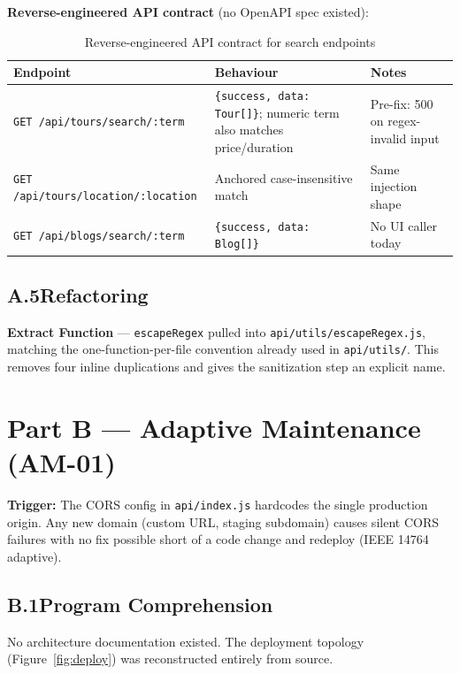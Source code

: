 \documentclass[11pt,a4paper]{article}
\begin{document}
\medskip\noindent\textbf{Reverse-engineered API contract} (no OpenAPI spec existed):
\begin{table}[H]
\centering\small
\begin{tabularx}{\textwidth}{@{}lXp{2.8cm}@{}}
\toprule
\textbf{Endpoint} & \textbf{Behaviour} & \textbf{Notes} \\
\midrule
\texttt{GET /api/tours/search/:term} &
  \texttt{\{success, data: Tour[]\}}; numeric term also matches price/duration &
  Pre-fix: 500 on regex-invalid input \\
\texttt{GET /api/tours/location/:location} &
  Anchored case-insensitive match &
  Same injection shape \\
\texttt{GET /api/blogs/search/:term} &
  \texttt{\{success, data: Blog[]\}} &
  No UI caller today \\
\bottomrule
\end{tabularx}
\caption{Reverse-engineered API contract for search endpoints}
\end{table}

\subsection{A.5\quad Refactoring}

\textbf{Extract Function} --- \texttt{escapeRegex} pulled into \texttt{api/utils/escapeRegex.js},
matching the one-function-per-file convention already used in \texttt{api/utils/}.
This removes four inline duplications and gives the sanitization step an explicit name.

\newpage
\section{Part B --- Adaptive Maintenance (AM-01)}

\noindent\textbf{Trigger:} The CORS config in \texttt{api/index.js} hardcodes the single
production origin. Any new domain (custom URL, staging subdomain) causes silent CORS failures
with no fix possible short of a code change and redeploy (IEEE 14764 adaptive).

\subsection{B.1\quad Program Comprehension}

No architecture documentation existed. The deployment topology (Figure~\ref{fig:deploy})
was reconstructed entirely from source.
\end{document}
